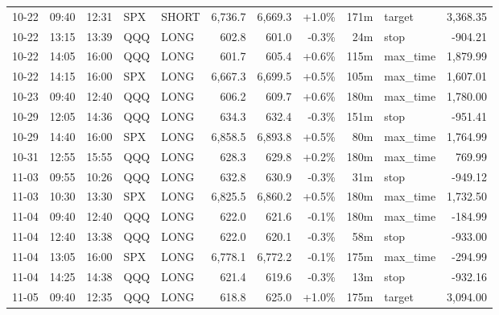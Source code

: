\documentclass[11pt,a4paper,twoside]{article}
\begin{document}
\begin{center}
\begin{longtable}{>{\color{txtmain}}l l l l l r r r r >{\color{txtmain}}l r}
10-22 & 09:40 & 12:31 & SPX & SHORT & 6,736.7 & 6,669.3 & \textcolor{wingreen}{+1.0\%} & 171m & target & \textcolor{wingreen}{3,368.35} \\
10-22 & 13:15 & 13:39 & QQQ & LONG & 602.8 & 601.0 & \textcolor{lossred}{-0.3\%} & 24m & stop & \textcolor{lossred}{-904.21} \\
10-22 & 14:05 & 16:00 & QQQ & LONG & 601.7 & 605.4 & \textcolor{wingreen}{+0.6\%} & 115m & max\_time & \textcolor{wingreen}{1,879.99} \\
10-22 & 14:15 & 16:00 & SPX & LONG & 6,667.3 & 6,699.5 & \textcolor{wingreen}{+0.5\%} & 105m & max\_time & \textcolor{wingreen}{1,607.01} \\
10-23 & 09:40 & 12:40 & QQQ & LONG & 606.2 & 609.7 & \textcolor{wingreen}{+0.6\%} & 180m & max\_time & \textcolor{wingreen}{1,780.00} \\
10-29 & 12:05 & 14:36 & QQQ & LONG & 634.3 & 632.4 & \textcolor{lossred}{-0.3\%} & 151m & stop & \textcolor{lossred}{-951.41} \\
10-29 & 14:40 & 16:00 & SPX & LONG & 6,858.5 & 6,893.8 & \textcolor{wingreen}{+0.5\%} & 80m & max\_time & \textcolor{wingreen}{1,764.99} \\
10-31 & 12:55 & 15:55 & QQQ & LONG & 628.3 & 629.8 & \textcolor{wingreen}{+0.2\%} & 180m & max\_time & \textcolor{wingreen}{769.99} \\
11-03 & 09:55 & 10:26 & QQQ & LONG & 632.8 & 630.9 & \textcolor{lossred}{-0.3\%} & 31m & stop & \textcolor{lossred}{-949.12} \\
11-03 & 10:30 & 13:30 & SPX & LONG & 6,825.5 & 6,860.2 & \textcolor{wingreen}{+0.5\%} & 180m & max\_time & \textcolor{wingreen}{1,732.50} \\
11-04 & 09:40 & 12:40 & QQQ & LONG & 622.0 & 621.6 & \textcolor{lossred}{-0.1\%} & 180m & max\_time & \textcolor{lossred}{-184.99} \\
11-04 & 12:40 & 13:38 & QQQ & LONG & 622.0 & 620.1 & \textcolor{lossred}{-0.3\%} & 58m & stop & \textcolor{lossred}{-933.00} \\
11-04 & 13:05 & 16:00 & SPX & LONG & 6,778.1 & 6,772.2 & \textcolor{lossred}{-0.1\%} & 175m & max\_time & \textcolor{lossred}{-294.99} \\
11-04 & 14:25 & 14:38 & QQQ & LONG & 621.4 & 619.6 & \textcolor{lossred}{-0.3\%} & 13m & stop & \textcolor{lossred}{-932.16} \\
11-05 & 09:40 & 12:35 & QQQ & LONG & 618.8 & 625.0 & \textcolor{wingreen}{+1.0\%} & 175m & target & \textcolor{wingreen}{3,094.00} \\

\end{longtable}
\end{center}
\end{document}
